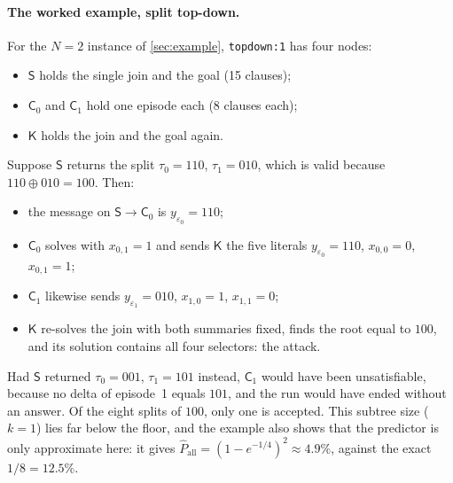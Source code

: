 \documentclass[11pt,a4paper]{article}
\newcommand{\dfam}[1]{\texttt{#1}}
\newcommand{\Pall}{\widehat{P}_{\mathrm{all}}}
\newcommand{\nS}{\mathsf{S}}\newcommand{\nK}{\mathsf{K}}\newcommand{\nC}{\mathsf{C}}
\begin{document}
\paragraph{The worked example, split top-down.}
For the $N=2$ instance of \cref{sec:example}, \dfam{topdown:1} has four nodes:
\begin{itemize}
\item $\nS$ holds the single join and the goal (15 clauses);
\item $\nC_0$ and $\nC_1$ hold one episode each (8 clauses each);
\item $\nK$ holds the join and the goal again.
\end{itemize}
Suppose $\nS$ returns the split $\tau_0=110$, $\tau_1=010$, which is valid because
$110\oplus010=100$. Then:
\begin{itemize}
\item the message on $\nS\to\nC_0$ is $y_{\varepsilon_0}=110$;
\item $\nC_0$ solves with $x_{0,1}=1$ and sends $\nK$ the five literals
      $y_{\varepsilon_0}=110$, $x_{0,0}=0$, $x_{0,1}=1$;
\item $\nC_1$ likewise sends $y_{\varepsilon_1}=010$, $x_{1,0}=1$, $x_{1,1}=0$;
\item $\nK$ re-solves the join with both summaries fixed, finds the root equal to $100$, and
      its solution contains all four selectors: the attack.
\end{itemize}
Had $\nS$ returned $\tau_0=001$, $\tau_1=101$ instead, $\nC_1$ would have been unsatisfiable,
because no delta of episode~1 equals $101$, and the run would have ended without an answer.
Of the eight splits of $100$, only one is accepted. This subtree size ($k=1$) lies far below
the floor, and the example also shows that the predictor is only approximate here: it gives
$\Pall=(1-e^{-1/4})^2\approx 4.9\%$, against the exact $1/8=12.5\%$.
\end{document}
